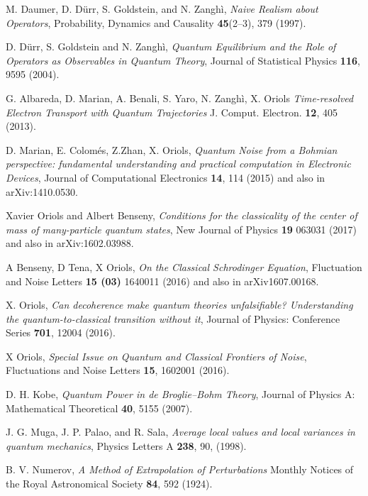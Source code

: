\documentclass[nofootinbib, secnumarabic, amsmath, nobibnotes,11pt,aps,pra, floatfix]{revtex4-1}
\begin{document}
\begin{thebibliography}{999}
M. Daumer, D. D\"{u}rr, S. Goldstein, and N. Zangh\`i, \emph{Naive Realism about Operators}, Probability, Dynamics and Causality \textbf{45}(2--3),  379 (1997).

D. D\"{u}rr, S. Goldstein and N. Zangh\`i, \emph{Quantum Equilibrium and the Role of Operators as Observables in Quantum Theory}, Journal of Statistical Physics \textbf{116},  9595 (2004).

G. Albareda, D. Marian, A. Benali, S. Yaro, N. Zangh\`i, X. Oriols \textit{Time-resolved Electron Transport with Quantum Trajectories} J. Comput. Electron. \textbf{12},  405 (2013). 

D. Marian, E. Colom\'{e}s, Z.Zhan, X. Oriols, \emph{Quantum Noise from a Bohmian perspective: fundamental understanding and practical computation in Electronic Devices}, Journal of Computational Electronics {\bf 14},  114 (2015) and also in arXiv:1410.0530.  

Xavier Oriols and Albert Benseny, \textit{Conditions for the classicality of the center of mass of many-particle quantum states}, New Journal of Physics \textbf{19}   063031 (2017) and also in arXiv:1602.03988.  

A Benseny, D Tena, X Oriols, \textit{On the Classical Schrodinger Equation}, Fluctuation and Noise Letters \textbf{15 (03)}  1640011 (2016) and also in arXiv1607.00168. 

X. Oriols, \emph{Can decoherence make quantum theories unfalsifiable? Understanding the quantum-to-classical transition without it}, Journal of Physics: Conference Series {\bf 701},  12004 (2016). 

X Oriols, \emph{Special Issue on Quantum and Classical Frontiers of Noise}, Fluctuations and Noise Letters  {\bf 15},  1602001 (2016). 

D. H. Kobe, \emph{Quantum Power in de Broglie--Bohm Theory}, Journal of Physics A: Mathematical Theoretical \textbf{40},  5155 (2007).

J. G. Muga, J. P. Palao, and R. Sala, \emph{ Average local values and local variances in quantum mechanics},  Physics Letters A {\bf 238},  90, (1998).

B. V. Numerov, \emph{A Method of Extrapolation of Perturbations} Monthly Notices of the Royal Astronomical Society \textbf{84},  592 (1924).


\end{thebibliography}
\end{document}
